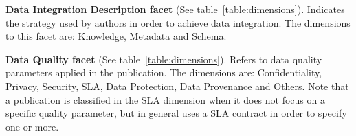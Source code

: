 \textbf{Data Integration Description facet} (See table~\ref{table:dimensions}).
Indicates the strategy used by authors in order to achieve data integration. 
The dimensions to this facet are: Knowledge, Metadata and Schema.

\textbf{Data Quality facet} (See table~\ref{table:dimensions}). 
Refers to data quality parameters applied in the publication. 
The dimensions are: Confidentiality, Privacy, Security, SLA, Data Protection, Data Provenance and Others.
Note that a publication is classified in the SLA dimension when it does not focus on a specific quality parameter, but in general uses a SLA contract in order to specify one or more.

